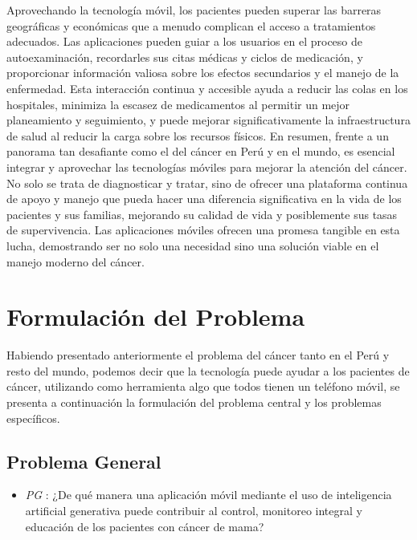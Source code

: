 Aprovechando la tecnología móvil, los pacientes pueden superar las barreras geográficas y económicas que a menudo complican el acceso a tratamientos adecuados. Las aplicaciones pueden guiar a los usuarios en el proceso de autoexaminación, recordarles sus citas médicas y ciclos de medicación, y proporcionar información valiosa sobre los efectos secundarios y el manejo de la enfermedad. Esta interacción continua y accesible ayuda a reducir las colas en los hospitales, minimiza la escasez de medicamentos al permitir un mejor planeamiento y seguimiento, y puede mejorar significativamente la infraestructura de salud al reducir la carga sobre los recursos físicos.
En resumen, frente a un panorama tan desafiante como el del cáncer en Perú y en el mundo, es esencial integrar y aprovechar las tecnologías móviles para mejorar la atención del cáncer. No solo se trata de diagnosticar y tratar, sino de ofrecer una plataforma continua de apoyo y manejo que pueda hacer una diferencia significativa en la vida de los pacientes y sus familias, mejorando su calidad de vida y posiblemente sus tasas de supervivencia. Las aplicaciones móviles ofrecen una promesa tangible en esta lucha, demostrando ser no solo una necesidad sino una solución viable en el manejo moderno del cáncer.





\section{Formulación del Problema}

Habiendo presentado anteriormente el problema del cáncer tanto en el Perú y resto del mundo, podemos decir que la tecnología puede ayudar a los pacientes de cáncer, utilizando como herramienta algo que todos tienen un teléfono móvil, se presenta a continuación la formulación del problema central y los problemas específicos.

\subsection{Problema General}

\begin{itemize}
	\item \textit{PG} : ¿De qué manera una aplicación móvil mediante el uso de inteligencia artificial generativa puede contribuir al control, monitoreo integral y educación de los pacientes con cáncer de mama?
 
\end{itemize}

